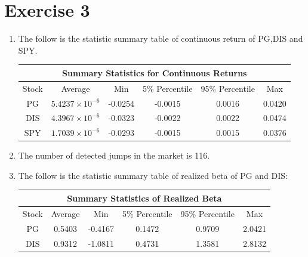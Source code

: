 \documentclass[12pt,letterpaper]{article}
\begin{document}
\section*{Exercise 3}
  \begin{enumerate}[label=\textbf{(\Alph*)}]
\item 
The follow is the statistic summary table of continuous return of PG,DIS and SPY.
\begin{table}[ht]
\centering %
\begin{tabular}{cccccc} %
\hline\hline %
\multicolumn{6}{c}{Summary Statistics for Continuous Returns}\\ [0.5ex]%
\hline Stock & Average & Min & 5\% Percentile & 95\% Percentile & Max\\
\hline
PG & $5.4237\times 10^{-6}$ & -0.0254 & -0.0015 & 0.0016 & 0.0420\\
DIS & $4.3967\times 10^{-6}$ & -0.0323 & -0.0022 & 0.0022 & 0.0474\\
SPY & $1.7039\times 10^{-6}$ & -0.0293 & -0.0015 & 0.0015 & 0.0376\\
\hline %
\end{tabular}
\end{table}

\item The number of detected jumps in the market is 116.
\item The follow is the statistic summary table of realized beta of PG and DIS:
\begin{table}[ht]
\centering %
\begin{tabular}{cccccc} %
\hline\hline %
\multicolumn{6}{c}{Summary Statistics of Realized Beta}\\ [0.5ex]%
\hline Stock & Average & Min & 5\% Percentile & 95\% Percentile & Max\\
\hline
PG & 0.5403 & -0.4167 & 0.1472 & 0.9709 & 2.0421\\
DIS & 0.9312 & -1.0811 & 0.4731 & 1.3581 & 2.8132\\
\hline %
\end{tabular}
\end{table}


\end{enumerate}
\end{document}
